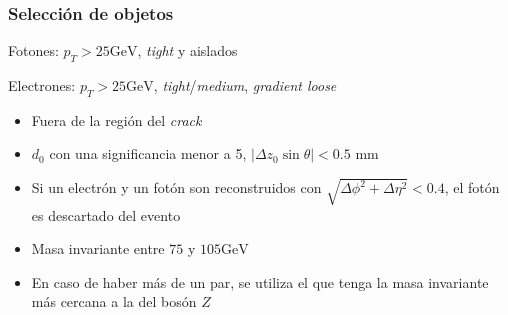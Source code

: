 \documentclass[10pt, compress,spanish]{beamer}
\begin{document}
\begin{frame}[fragile]
\frametitle{Selección de objetos}

\normalsize


\begin{block}{Fotones:}
$p_{T} > 25 \text{GeV}$, \textit{tight} y aislados
\end{block}

\begin{block}{Electrones:}
$p_{T} > 25 \text{GeV}$, \textit{tight}/\textit{medium}, \textit{gradient loose}
\end{block}

\vspace{1cm}

\begin{itemize}
\item Fuera de la región del \textit{crack} 

\item $d_{0}$ con una significancia menor a 5, $|\Delta z_{0}\sin\theta|<0.5$ mm

\item Si un electrón y un fotón son reconstruidos con $\sqrt{\Delta\phi^{2}+\Delta\eta^{2}}<0.4$, el fotón es descartado del evento

\item Masa invariante entre $75$ y $105 \text{GeV}$

\item En caso de haber más de un par, se utiliza el que tenga la masa invariante más cercana a la del bosón $Z$

\end{itemize}

\end{frame}




\end{document}
